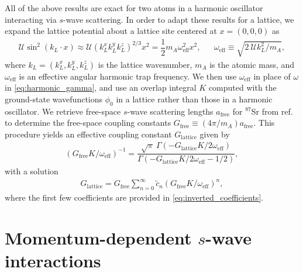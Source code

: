 \documentclass[preprint,showkeys,nofootinbib]{revtex4-1}
\renewcommand{\t}{\text} %
\newcommand{\f}{\dfrac} %
\newcommand{\p}[1]{\left(#1\right)} %
\newcommand{\U}{\mathcal{U}}
\newcommand{\1}{\mathds{1}}
\begin{document}
All of the above results are exact for two atoms in a harmonic
oscillator interacting via $s$-wave scattering.  In order to adapt
these results for a lattice, we expand the lattice potential about a
lattice site centered at $x=(0,0,0)$ as
\begin{align}
  \U\sin^2\p{k_L\cdot x} \approx \U \p{k_L^x k_L^y k_L^z}^{2/3} x^2
  = \f12 m_A \omega_{\t{eff}}^2 x^2,
  &&
  \omega_{\t{eff}} \equiv \sqrt{2~ \U k_L^2 / m_A},
\end{align}
where $k_L=\p{k_L^x,k_L^y,k_L^z}$ is the lattice wavenumber, $m_A$ is
the atomic mass, and $\omega_{\t{eff}}$ is an effective angular
harmonic trap frequency.  We then use $\omega_{\t{eff}}$ in place of
$\omega$ in \eqref{eq:harmonic_gamma}, and use an overlap integral $K$
computed with the ground-state wavefunctions $\phi_0$ in a lattice
rather than those in a harmonic oscillator.  We retrieve free-space
$s$-wave scattering lengths $a_{\t{free}}$ for ${}^{87}$Sr from
ref.~\cite{zhang2014spectroscopic} to determine the free-space
coupling constants $G_{\t{free}} \equiv \p{4\pi/m_A} a_{\t{free}}$.
This procedure yields an effective coupling constant $G_{\t{lattice}}$
given by
\begin{align}
  \p{G_{\t{free}} K/\omega_{\t{eff}}}^{-1}
  = \f{\sqrt{\pi}~ \Gamma\p{-G_{\t{lattice}}K/2\omega_{\t{eff}}}}
  {\Gamma\p{-G_{\t{lattice}}K/2\omega_{\t{eff}}-1/2}},
\end{align}
with a solution
\begin{align}
  G_{\t{lattice}} = G_{\t{free}}
  \sum_{n=0}^\infty \tilde c_n \p{G_{\t{free}}K/\omega_{\t{eff}}}^n,
\end{align}
where the first few coefficients are provided in
\eqref{eq:inverted_coefficients}.


\section{Momentum-dependent $s$-wave interactions}
\label{sec:momentum_dependence}
\end{document}
